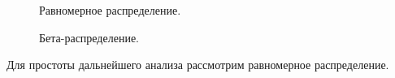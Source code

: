 \documentclass[14pt,a4paper]{scrartcl}
\begin{document}
\begin{figure}[t!]
	\caption{Равномерное распределение.}
	\label{ris:fit_unif}
\end{figure}

\begin{figure}[t!]
	\caption{Бета-распределение.}
	\label{ris:fit_beta}
\end{figure}




\newpage

Для простоты дальнейшего анализа рассмотрим равномерное распределение.
\end{document}
